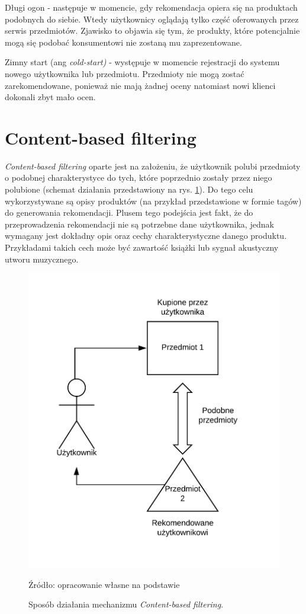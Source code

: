 Długi ogon - następuje w momencie, gdy rekomendacja opiera się na produktach podobnych do siebie. Wtedy użytkownicy oglądają tylko część oferowanych przez serwis przedmiotów. Zjawisko to objawia się tym, że produkty, które potencjalnie mogą się podobać konsumentowi nie zostaną mu zaprezentowane.

Zimny start (ang \textit{cold-start)} - występuje w momencie rejestracji do systemu nowego użytkownika lub przedmiotu. Przedmioty nie mogą zostać zarekomendowane, ponieważ nie mają żadnej oceny natomiast nowi klienci dokonali zbyt mało ocen.

\section{Content-based filtering}
\textit{Content-based filtering} oparte jest na założeniu, że użytkownik polubi przedmioty o podobnej charakterystyce do tych, które poprzednio zostały przez niego polubione (schemat działania przedstawiony na rys. \ref{fig:content-based}). Do tego celu wykorzystywane są opisy produktów (na przykład przedstawione w formie tagów) do generowania rekomendacji. Plusem tego podejścia jest fakt, że do przeprowadzenia rekomendacji nie są potrzebne dane użytkownika, jednak wymagany jest dokładny opis oraz cechy charakterystyczne danego produktu. Przykładami takich cech może być zawartość książki lub sygnał akustyczny utworu muzycznego.

\begin{figure}
    \centering
    \includegraphics{images/content-based.png}
    \caption{Sposób działania mechanizmu \textit{Content-based filtering}.}
    Źródło: opracowanie własne na podstawie \cite{challenges_solutions_survey}
    \label{fig:content-based}
\end{figure}

